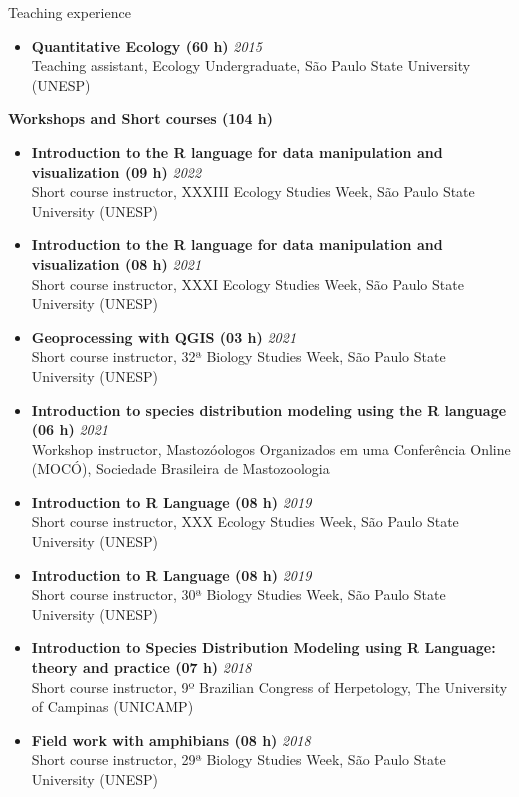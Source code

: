 \documentclass{resume}
\begin{document}
\begin{rSection}{Teaching experience}
\begin{itemize}
\item {\bf Quantitative Ecology (60 h)} \hfill{\em 2015} 
\\ Teaching assistant, Ecology Undergraduate, São Paulo State University (UNESP)
\end{itemize}

{\bf Workshops and Short courses (104 h)}
\begin{itemize}
\item {\bf Introduction to the R language for data manipulation and visualization (09 h)} \hfill{\em 2022} 
\\ Short course instructor, XXXIII Ecology Studies Week, São Paulo State University (UNESP)

\item {\bf Introduction to the R language for data manipulation and visualization (08 h)} \hfill{\em 2021} 
\\ Short course instructor, XXXI Ecology Studies Week, São Paulo State University (UNESP)

\item {\bf Geoprocessing with QGIS (03 h)} \hfill{\em 2021} 
\\ Short course instructor, 32ª Biology Studies Week, São Paulo State University (UNESP)

\item {\bf Introduction to species distribution modeling using the R language (06 h)} \hfill{\em 2021} 
\\ Workshop instructor, Mastozóologos Organizados em uma Conferência Online (MOCÓ), Sociedade Brasileira de Mastozoologia

\item {\bf Introduction to R Language (08 h)} \hfill{\em 2019} 
\\ Short course instructor, XXX Ecology Studies Week, São Paulo State University (UNESP) 

\item {\bf Introduction to R Language (08 h)} \hfill{\em 2019} 
\\ Short course instructor, 30ª Biology Studies Week, São Paulo State University (UNESP)

\item {\bf Introduction to Species Distribution Modeling using R Language: theory and practice (07 h)} \hfill{\em 2018} 
\\ Short course instructor, 9º Brazilian Congress of Herpetology, The University of Campinas (UNICAMP)

\item {\bf Field work with amphibians (08 h)} \hfill{\em 2018} 
\\ Short course instructor, 29ª Biology Studies Week, São Paulo State University (UNESP) 


\end{itemize}
\end{rSection}
\end{document}
